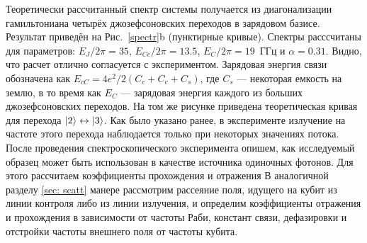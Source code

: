 Теоретически рассчитанный спектр системы получается из диагонализации гамильтониана четырёх джозефсоновских переходов в зарядовом базисе. Результат приведён на Рис.~\ref{spectr}b (пунктирные кривые). Спектры расссчитаны для параметров: $E_J/2\pi=35$, $E_{Cc}/2\pi=13.5$, $E_C/2\pi=19$~ГГц и $\alpha=0.31$.  Видно, что расчет отлично согласуется с экспериментом. Зарядовая энергия связи обозначена как $E_{cC} = 4e^2/2(C_c+C_e+C_s)$, где $C_s$ --- некоторая емкость на землю, в то время как $E_C$ --- зарядовая энергия каждого из больших джозефсоновских переходов. На том же рисунке приведена теоретическая кривая для перехода  $\ket{2} \leftrightarrow \ket{3}$. Как было указано ранее, в эксперименте излучение на частоте этого перехода наблюдается только при некоторых значениях потока.
После проведения спектроскопического эксперимента опишем, как исследуемый образец может быть использован в качестве источника одиночных фотонов. Для этого рассчитаем коэффициенты прохождения и отражения В аналогичной разделу \ref{sec: scatt} манере рассмотрим рассеяние поля, идущего на кубит из линии контроля либо из линии излучения, и определим коэффициенты отражения и прохождения в зависимости от частоты Раби, констант связи, дефазировки и отстройки частоты внешнего поля от частоты кубита.
